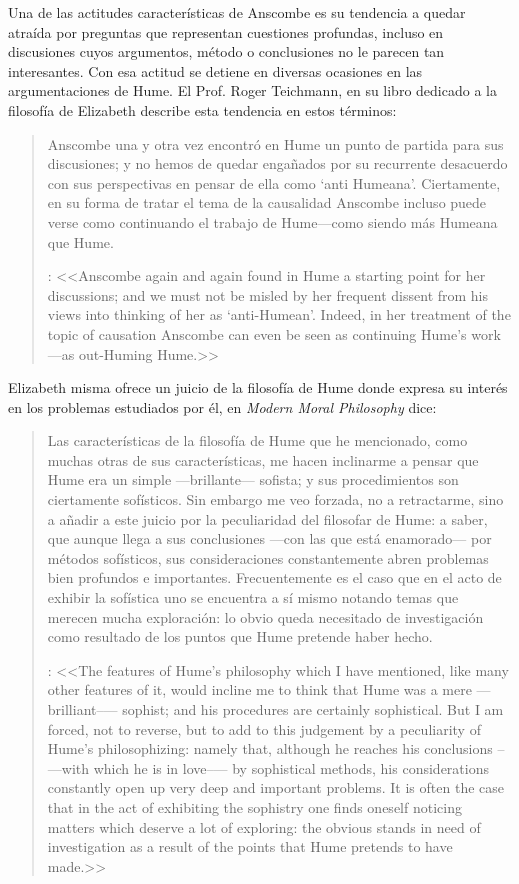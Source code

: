 Una de las actitudes características de Anscombe es su tendencia a quedar atraída por preguntas que representan cuestiones profundas, incluso en discusiones cuyos argumentos, método o conclusiones no le parecen tan interesantes. Con esa actitud se detiene en diversas ocasiones en las argumentaciones de Hume. El Prof. Roger Teichmann, en su libro dedicado a la filosofía de Elizabeth describe esta tendencia en estos términos: \blockquote[{\cite[177]{teichmann2008ans}}: <<Anscombe again and again found in Hume a starting point for her discussions; and we must not be misled by her frequent dissent from his views into thinking of her as `anti-Humean'. Indeed, in her treatment of the topic of causation Anscombe can even be seen as continuing Hume's work---as out-Huming Hume.>>]{Anscombe una y otra vez encontró en Hume un punto de partida para sus discusiones; y no hemos de quedar engañados por su recurrente desacuerdo con sus perspectivas en pensar de ella como `anti Humeana'. Ciertamente, en su forma de tratar el tema de la causalidad Anscombe incluso puede verse como continuando el trabajo de Hume---como siendo más Humeana que Hume.} Elizabeth misma ofrece un juicio de la filosofía de Hume donde expresa su interés en los problemas estudiados por él, en \emph{Modern Moral Philosophy} dice: \blockquote[{\cite[28]{anscombe1981erp:mmph}}: <<The features of Hume’s philosophy which I have mentioned, like many other features of it, would incline me to think that Hume was a mere ---brilliant--— sophist; and his procedures are certainly sophistical. But I am forced, not to reverse, but to add to this judgement by a peculiarity of Hume’s philosophizing: namely that, although he reaches his conclusions --—with which he is in love--— by sophistical methods, his considerations constantly open up very deep and important problems. It is often the case that in the act of exhibiting the sophistry one finds oneself noticing matters which deserve a lot of exploring: the obvious stands in need of investigation as a result of the points that Hume pretends to have made.>>]{Las características de la filosofía de Hume que he mencionado, como muchas otras de sus características, me hacen inclinarme a pensar que Hume era un simple ---brillante--- sofista; y sus procedimientos son ciertamente sofísticos. Sin embargo me veo forzada, no a retractarme, sino a añadir a este juicio por la peculiaridad del filosofar de Hume: a saber, que aunque llega a sus conclusiones ---con las que está enamorado--- por métodos sofísticos, sus consideraciones constantemente abren problemas bien profundos e importantes. Frecuentemente es el caso que en el acto de exhibir la sofística uno se encuentra a sí mismo notando temas que merecen mucha exploración: lo obvio queda necesitado de investigación como resultado de los puntos que Hume pretende haber hecho.}


